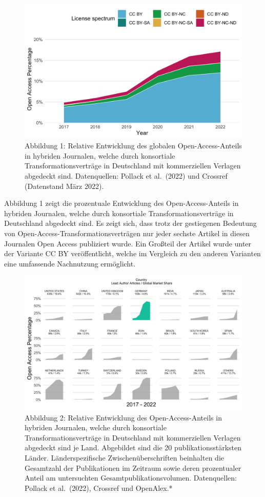\documentclass[a4paper,
fontsize=11pt,
oneside,
numbers=noperiodatend,
parskip=half-,
bibliography=totoc,
final
]{scrartcl}
\begin{document}
\begin{figure}
\centering
\includegraphics{fig/fig_1.png}
\caption{Abbildung 1: Relative Entwicklung des globalen
Open-Access-Anteils in hybriden Journalen, welche durch konsortiale
Transformationsverträge in Deutschland mit kommerziellen Verlagen
abgedeckt sind. Datenquellen: Pollack et al.~(2022) und Crossref
(Datenstand März 2022).}
\end{figure}

Abbildung 1 zeigt die prozentuale Entwicklung des Open-Access-Anteils in
hybriden Journalen, welche durch konsortiale Transformationsverträge in
Deutschland abgedeckt sind. Es zeigt sich, dass trotz der gestiegenen
Bedeutung von Open-Access-Transformationsverträgen nur jeder sechste
Artikel in diesen Journalen Open Access publiziert wurde. Ein Großteil
der Artikel wurde unter der Variante CC BY veröffentlicht, welche im
Vergleich zu den anderen Varianten eine umfassende Nachnutzung
ermöglicht.

\begin{figure}
\centering
\includegraphics{fig/fig_2.png}
\caption{Abbildung 2: Relative Entwicklung des Open-Access-Anteils in
hybriden Journalen, welche durch konsortiale Transformationsverträge in
Deutschland mit kommerziellen Verlagen abgedeckt sind je Land.
Abgebildet sind die 20 publikationsstärksten Länder. Länderspezifische
Zwischenüberschriften beinhalten die Gesamtzahl der Publikationen im
Zeitraum sowie deren prozentualer Anteil am untersuchten
Gesamtpublikationsvolumen. Datenquellen: Pollack et al.~(2022), Crossref
und OpenAlex.*}
\end{figure}
\end{document}
